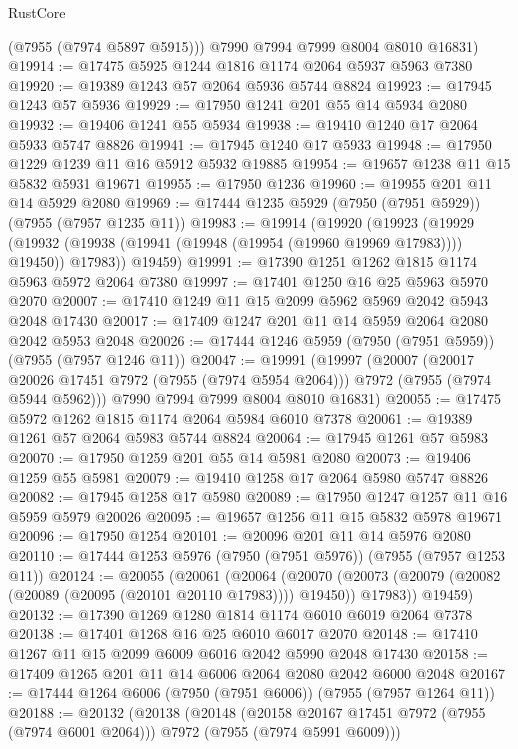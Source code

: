 \begin{lexlean}{RustCore}
\begin{coremodule}
        (@7955 (@7974 @5897 @5915)))
      @7990
      @7994
      @7999
      @8004
      @8010
      @16831)
@19914 := @17475 @5925 @1244 @1816 @1174 @2064 @5937 @5963 @7380
@19920 := @19389 @1243 @57 @2064 @5936 @5744 @8824
@19923 := @17945 @1243 @57 @5936
@19929 := @17950 @1241 @201 @55 @14 @5934 @2080
@19932 := @19406 @1241 @55 @5934
@19938 := @19410 @1240 @17 @2064 @5933 @5747 @8826
@19941 := @17945 @1240 @17 @5933
@19948 := @17950 @1229 @1239 @11 @16 @5912 @5932 @19885
@19954 := @19657 @1238 @11 @15 @5832 @5931 @19671
@19955 := @17950 @1236
@19960 := @19955 @201 @11 @14 @5929 @2080
@19969 := @17444 @1235 @5929 (@7950 (@7951 @5929)) (@7955 (@7957 @1235 @11))
@19983 := @19914
    (@19920
      (@19923
        (@19929 (@19932 (@19938 (@19941 (@19948 (@19954 (@19960 @19969 @17983)))) @19450)) @17983))
      @19459)
@19991 := @17390 @1251 @1262 @1815 @1174 @5963 @5972 @2064 @7380
@19997 := @17401 @1250 @16 @25 @5963 @5970 @2070
@20007 := @17410 @1249 @11 @15 @2099 @5962 @5969 @2042 @5943 @2048 @17430
@20017 := @17409 @1247 @201 @11 @14 @5959 @2064 @2080 @2042 @5953 @2048
@20026 := @17444 @1246 @5959 (@7950 (@7951 @5959)) (@7955 (@7957 @1246 @11))
@20047 := @19991
    (@19997
      (@20007
        (@20017 @20026 @17451 @7972 (@7955 (@7974 @5954 @2064)))
        @7972
        (@7955 (@7974 @5944 @5962)))
      @7990
      @7994
      @7999
      @8004
      @8010
      @16831)
@20055 := @17475 @5972 @1262 @1815 @1174 @2064 @5984 @6010 @7378
@20061 := @19389 @1261 @57 @2064 @5983 @5744 @8824
@20064 := @17945 @1261 @57 @5983
@20070 := @17950 @1259 @201 @55 @14 @5981 @2080
@20073 := @19406 @1259 @55 @5981
@20079 := @19410 @1258 @17 @2064 @5980 @5747 @8826
@20082 := @17945 @1258 @17 @5980
@20089 := @17950 @1247 @1257 @11 @16 @5959 @5979 @20026
@20095 := @19657 @1256 @11 @15 @5832 @5978 @19671
@20096 := @17950 @1254
@20101 := @20096 @201 @11 @14 @5976 @2080
@20110 := @17444 @1253 @5976 (@7950 (@7951 @5976)) (@7955 (@7957 @1253 @11))
@20124 := @20055
    (@20061
      (@20064
        (@20070 (@20073 (@20079 (@20082 (@20089 (@20095 (@20101 @20110 @17983)))) @19450)) @17983))
      @19459)
@20132 := @17390 @1269 @1280 @1814 @1174 @6010 @6019 @2064 @7378
@20138 := @17401 @1268 @16 @25 @6010 @6017 @2070
@20148 := @17410 @1267 @11 @15 @2099 @6009 @6016 @2042 @5990 @2048 @17430
@20158 := @17409 @1265 @201 @11 @14 @6006 @2064 @2080 @2042 @6000 @2048
@20167 := @17444 @1264 @6006 (@7950 (@7951 @6006)) (@7955 (@7957 @1264 @11))
@20188 := @20132
    (@20138
      (@20148
        (@20158 @20167 @17451 @7972 (@7955 (@7974 @6001 @2064)))
        @7972
        (@7955 (@7974 @5991 @6009)))

\end{coremodule}
\end{lexlean}
